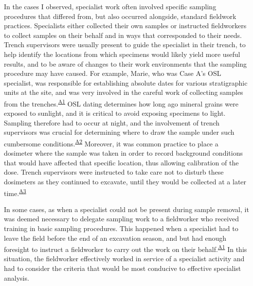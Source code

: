 \documentclass[
  canadian,
]{article}
\begin{document}
In the cases I observed, specialist work often involved specific
sampling procedures that differed from, but also occurred alongside,
standard fieldwork practices. Specialists either collected their own
samples or instructed fieldworkers to collect samples on their behalf
and in ways that corresponded to their needs. Trench supervisors were
usually present to guide the specialist in their trench, to help
identify the locations from which specimens would likely yield more
useful results, and to be aware of changes to their work environments
that the sampling procedure may have caused. For example, Marie, who was
Case A's OSL specialist, was responsible for establishing absolute dates
for various stratigraphic units at the site, and was very involved in
the careful work of collecting samples from the
trenches.\textsuperscript{\hyperref[sec-A1]{A1}} OSL dating determines
how long ago mineral grains were exposed to sunlight, and it is critical
to avoid exposing specimens to light. Sampling therefore had to occur at
night, and the involvement of trench supervisors was crucial for
determining where to draw the sample under such cumbersome
conditions.\textsuperscript{\hyperref[sec-A2]{A2}} Moreover, it was
common practice to place a dosimeter where the sample was taken in order
to record background conditions that would have affected that specific
location, thus allowing calibration of the dose. Trench supervisors were
instructed to take care not to disturb these dosimeters as they
continued to excavate, until they would be collected at a later
time.\textsuperscript{\hyperref[sec-A3]{A3}}

In some cases, as when a specialist could not be present during sample
removal, it was deemed necessary to delegate sampling work to a
fieldworker who received training in basic sampling procedures. This
happened when a specialist had to leave the field before the end of an
excavation season, and but had enough foresight to instruct a
fieldworker to carry out the work on their
behalf.\textsuperscript{\hyperref[sec-A1]{A1}} In this situation, the
fieldworker effectively worked in service of a specialist activity and
had to consider the criteria that would be most conducive to effective
specialist analysis.
\end{document}
